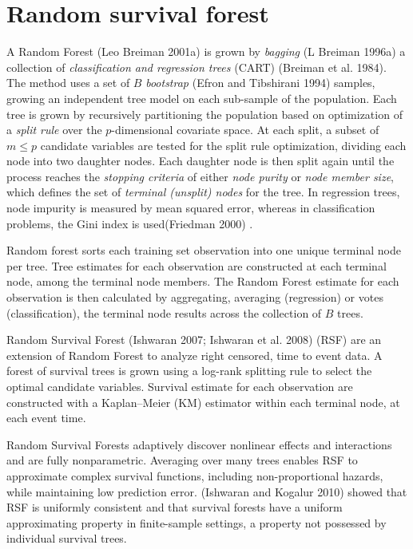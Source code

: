 \documentclass[article, nojss]{jss}
\begin{document}
\section{Random survival forest}\label{random-survival-forest}

A Random Forest (Leo Breiman 2001a) is grown by \emph{bagging} (L
Breiman 1996a) a collection of
\emph{classification and regression trees} (CART) (Breiman et al. 1984).
The method uses a set of \(B\) \emph{bootstrap} (Efron and Tibshirani
1994) samples, growing an independent tree model on each sub-sample of
the population. Each tree is grown by recursively partitioning the
population based on optimization of a \emph{split rule} over the
\(p\)-dimensional covariate space. At each split, a subset of
\(m \le p\) candidate variables are tested for the split rule
optimization, dividing each node into two daughter nodes. Each daughter
node is then split again until the process reaches the
\emph{stopping criteria} of either \emph{node purity} or
\emph{node member size}, which defines the set of
\emph{terminal (unsplit) nodes} for the tree. In regression trees, node
impurity is measured by mean squared error, whereas in classification
problems, the Gini index is used(Friedman 2000) .

Random forest sorts each training set observation into one unique
terminal node per tree. Tree estimates for each observation are
constructed at each terminal node, among the terminal node members. The
Random Forest estimate for each observation is then calculated by
aggregating, averaging (regression) or votes (classification), the
terminal node results across the collection of \(B\) trees.

Random Survival Forest (Ishwaran 2007; Ishwaran et al. 2008) (RSF) are
an extension of Random Forest to analyze right censored, time to event
data. A forest of survival trees is grown using a log-rank splitting
rule to select the optimal candidate variables. Survival estimate for
each observation are constructed with a Kaplan--Meier (KM) estimator
within each terminal node, at each event time.

Random Survival Forests adaptively discover nonlinear effects and
interactions and are fully nonparametric. Averaging over many trees
enables RSF to approximate complex survival functions, including
non-proportional hazards, while maintaining low prediction error.
(Ishwaran and Kogalur 2010) showed that RSF is uniformly consistent and
that survival forests have a uniform approximating property in
finite-sample settings, a property not possessed by individual survival
trees.
\end{document}
